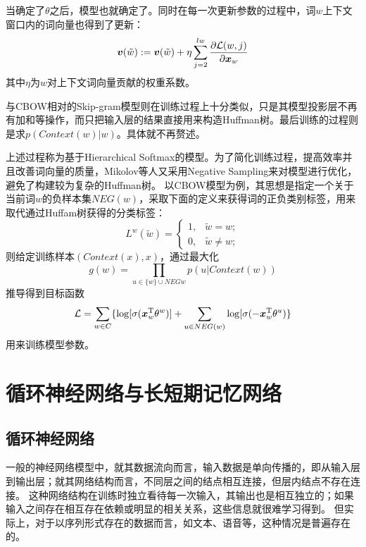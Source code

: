 当确定了$\theta$之后，模型也就确定了。同时在每一次更新参数的过程中，词$w$上下文窗口内的词向量也得到了更新：
\begin{equation}
    \boldsymbol{v}(\tilde{w}) := \boldsymbol{v}(\tilde{w}) + \eta\sum^{l{w}}_{j=2}\frac{\partial\mathcal{L}(w,j)}{\partial \boldsymbol{x}_w}
\end{equation}
其中$\eta$为$w$对上下文词向量贡献的权重系数。

与CBOW相对的Skip-gram模型则在训练过程上十分类似，只是其模型投影层不再有加和等操作，而只把输入层的结果直接用来构造Huffman树。最后训练的过程则是求$p(Context(w)|w)$。具体就不再赘述。

上述过程称为基于Hierarchical Softmax的模型。为了简化训练过程，提高效率并且改善词向量的质量，Mikolov等人又采用Negative Sampling来对模型进行优化，避免了构建较为复杂的Huffman树。
以CBOW模型为例，其思想是指定一个关于当前词$w$的负样本集$NEG(w)$，采取下面的定义来获得词的正负类别标签，用来取代通过Huffam树获得的分类标签：
\begin{equation}
    L^w(\tilde{w}) = \left\{
        \begin{aligned}
            1, &\tilde{w} = w;\\
            0, &\tilde{w} \neq w;
        \end{aligned}
    \right.
\end{equation}
则给定训练样本$(Context(x), x)$，通过最大化
\begin{equation}
    g(w) = \prod_{u\in\{w\}\cup NEG{w}}p(u|Context(w))
\end{equation}
推导得到目标函数
\begin{equation}
    \mathcal{L} = \sum_{w\in C}\{\log[\sigma(\boldsymbol{x}_w^\mathrm{T}\theta^w)] + \sum_{u\in NEG(w)}\log[\sigma(-\boldsymbol{x}_w^\mathrm{T}\theta^u)\}
\end{equation}
用来训练模型参数。

\section{循环神经网络与长短期记忆网络}
\subsection{循环神经网络}
一般的神经网络模型中，就其数据流向而言，输入数据是单向传播的，即从输入层到输出层；就其网络结构而言，不同层之间的结点相互连接，但层内结点不存在连接。
这种网络结构在训练时独立看待每一次输入，其输出也是相互独立的；如果输入之间存在相互存在依赖或明显的相关关系，这些信息就很难学习得到。
但实际上，对于以序列形式存在的数据而言，如文本、语音等，这种情况是普遍存在的。

